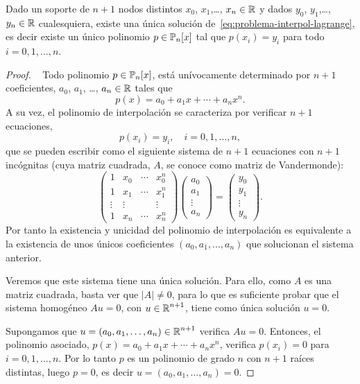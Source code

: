  \begin{theorem}
   \label{thm:existencia-unicidad-lagrange}
   Dado un soporte de $n+1$ nodos distintos $x_0$, $x_1$,\dots, $x_n
   \in \operatorname{{\mathbb R}}$ y dados $y_0$, $y_1$,\dots, $y_n\in\operatorname{{\mathbb R}}$ cualesquiera,
   existe una única solución de~\eqref{eq:problema-interpol-lagrange},
   es decir existe un único polinomio $p\in\operatorname{{\mathbb P}}_n[x]$ tal que
   $p(x_i)=y_i$ para todo $i=0,1,\dots,n$.
 \end{theorem}
 \begin{proof}~
   Todo polinomio $p\in\operatorname{{\mathbb P}}_n[x]$, está unívocamente determinado por
   $n+1$ coeficientes, $a_0$, $a_1$, \dots, $a_n\in\operatorname{{\mathbb R}}$ tales que
   \begin{equation}
     p(x)=a_0 + a_1 x + \cdots + a_n x^n.
   \end{equation}
   A su vez, el polinomio de interpolación se caracteriza por verificar
   $n+1$ ecuaciones,
   $$
   p(x_i)=y_i, \quad i=0,1,\dots,n,
   $$
   que se pueden escribir como el siguiente sistema de $n+1$ ecuaciones
   con $n+1$ incógnitas (cuya matriz cuadrada, $A$, se conoce como
   matriz de Vandermonde):
   \begin{equation}
     \begin{pmatrix}
       1 & x_0& \cdots & x_0^n \\
       1 & x_1& \cdots & x_1^n \\
       \vdots & \vdots & & \vdots \\
       1 & x_n& \cdots & x_n^n 
     \end{pmatrix}
     \begin{pmatrix}
       a_0 \\ a_1 \\ \vdots \\ a_n
     \end{pmatrix}
     =
     \begin{pmatrix}
       y_0 \\ y_1 \\ \vdots \\ y_n
     \end{pmatrix}.
   \end{equation}
   Por tanto la existencia y unicidad del polinomio de interpolación es
   equivalente a la existencia de unos únicos coeficientes
   $(a_0,a_1,...,a_n)$ que solucionan el sistema anterior.

     Veremos que
   este sistema tiene una única solución. Para ello, como $A$ es una
   matriz cuadrada, basta ver que $|A|\neq 0$, para lo que es suficiente
   probar que el sistema homogéneo $Au=0$, con $u\in\operatorname{{\mathbb R}}^{n+1}$, tiene
   como única solución $u=0$.

   Supongamos que $u=(a_0,a_1,\dots,a_n) \in\operatorname{{\mathbb R}}^{n+1}$ verifica
   $Au=0$. Entonces, el polinomio asociado, $p(x)=a_0 + a_1x + \cdots
   + a_n x^n$, verifica $p(x_i)=0$ para $i=0,1,\dots,n$.  Por lo tanto $p$ es un
   polinomio de grado $n$ con $n+1$ raíces distintas, luego
   $p=0$, es decir $u=(a_0,a_1,\dots,a_n)=0$. 
 \end{proof}

